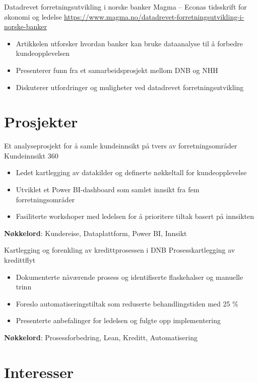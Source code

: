 \documentclass[a4paper, serif, 10pt]{moderncv}
\begin{document}
        {Datadrevet forretningsutvikling i norske banker}
        {Magma – Econas tidsskrift for økonomi og ledelse}
        {\url{https://www.magma.no/datadrevet-forretningsutvikling-i-norske-banker}}
        {}
        {\begin{itemize}
\item Artikkelen utforsker hvordan banker kan bruke dataanalyse til å forbedre kundeopplevelsen
\item Presenterer funn fra et samarbeidsprosjekt mellom DNB og NHH
\item Diskuterer utfordringer og muligheter ved datadrevet forretningsutvikling
\end{itemize}}
\section{Prosjekter}

        {Et analyseprosjekt for å samle kundeinnsikt på tvers av forretningsområder}
        {Kundeinnsikt 360}
        {}
        {}
        {\begin{itemize}
\item Ledet kartlegging av datakilder og definerte nøkkeltall for kundeopplevelse
\item Utviklet et Power BI-dashboard som samlet innsikt fra fem forretningsområder
\item Fasiliterte workshoper med ledelsen for å prioritere tiltak basert på innsikten
\end{itemize}
\textbf{Nøkkelord}: Kundereise, Dataplattform, Power BI, Innsikt}

        {Kartlegging og forenkling av kredittprosessen i DNB}
        {Prosesskartlegging av kredittflyt}
        {}
        {}
        {\begin{itemize}
\item Dokumenterte nåværende prosess og identifiserte flaskehalser og manuelle trinn
\item Foreslo automatiseringstiltak som reduserte behandlingstiden med 25 \%
\item Presenterte anbefalinger for ledelsen og fulgte opp implementering
\end{itemize}
\textbf{Nøkkelord}: Prosessforbedring, Lean, Kreditt, Automatisering}
\section{Interesser}
\end{document}
